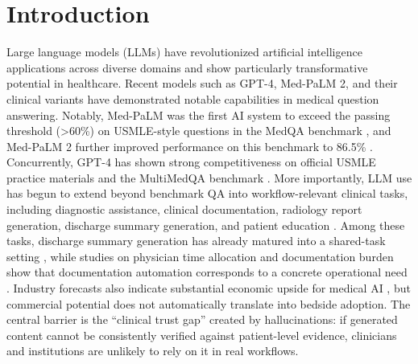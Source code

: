 \documentclass[11pt]{article}
\begin{document}
\section{Introduction}
Large language models (LLMs) have revolutionized artificial intelligence applications across diverse domains and show particularly transformative potential in healthcare. Recent models such as GPT-4, Med-PaLM 2, and their clinical variants have demonstrated notable capabilities in medical question answering. Notably, Med-PaLM was the first AI system to exceed the passing threshold (\textgreater60\%) on USMLE-style questions in the MedQA benchmark \citep{singhal2023clinicalKnowledge}, and Med-PaLM 2 further improved performance on this benchmark to 86.5\% \citep{singhal2023expertMedicalQA}. Concurrently, GPT-4 has shown strong competitiveness on official USMLE practice materials and the MultiMedQA benchmark \citep{nori2023gpt4Medical}. More importantly, LLM use has begun to extend beyond benchmark QA into workflow-relevant clinical tasks, including diagnostic assistance, clinical documentation, radiology report generation, discharge summary generation, and patient education \citep{lee2023gpt4Medicine,thirunavukarasu2023llmMedicine,xu2024dischargeMeSharedTask}. Among these tasks, discharge summary generation has already matured into a shared-task setting \citep{xu2024dischargeMeSharedTask}, while studies on physician time allocation and documentation burden show that documentation automation corresponds to a concrete operational need \citep{sinsky2016physicianTime,zhao2025clinicalDocumentationBurden}. Industry forecasts also indicate substantial economic upside for medical AI \citep{marketsandmarkets2025healthcareAI}, but commercial potential does not automatically translate into bedside adoption. The central barrier is the ``clinical trust gap'' created by hallucinations: if generated content cannot be consistently verified against patient-level evidence, clinicians and institutions are unlikely to rely on it in real workflows.
\end{document}
